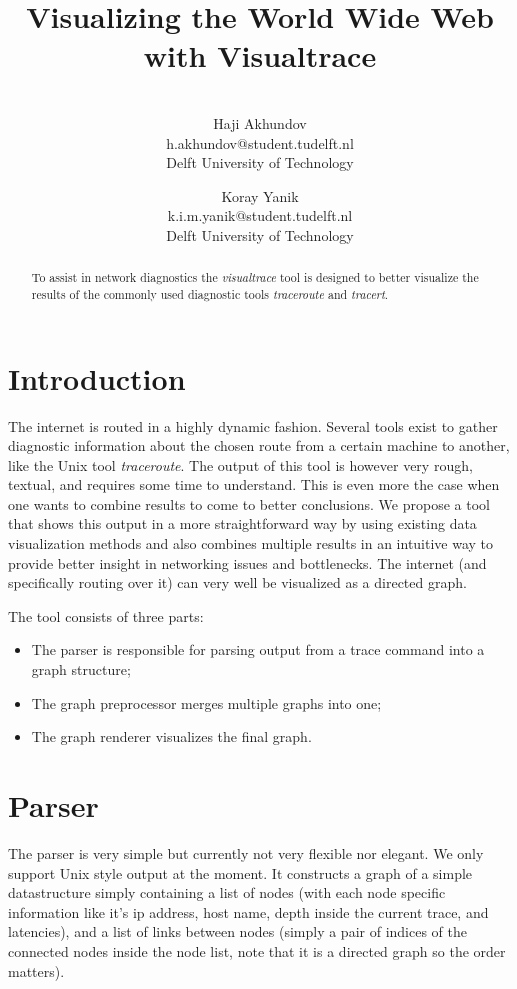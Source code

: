 \documentclass[a4paper,10pt]{article}
\title{Visualizing the World Wide Web with Visualtrace}
\author{\\Haji Akhundov\\h.akhundov@student.tudelft.nl\\ Delft University of Technology \and Koray Yanik\\k.i.m.yanik@student.tudelft.nl\\ Delft University of Technology}
\begin{document}
\maketitle

\begin{abstract}
To assist in network diagnostics the \emph{visualtrace} tool is designed to better visualize the results of the commonly used diagnostic tools \emph{traceroute} and \emph{tracert}.
\end{abstract}

\section{Introduction}
The internet is routed in a highly dynamic fashion. Several tools exist to gather diagnostic information about the chosen route from a certain machine to another, like the Unix tool \emph{traceroute}. The output of this tool is however very rough, textual, and requires some time to understand. This is even more the case when one wants to combine results to come to better conclusions. We propose a tool that shows this output in a more straightforward way by using existing data visualization methods and also combines multiple results in an intuitive way to provide better insight in networking issues and bottlenecks. The internet (and specifically routing over it) can very well be visualized as a directed graph.

The tool consists of three parts:
\begin{itemize}
\item The parser is responsible for parsing output from a trace command into a graph structure;
\item The graph preprocessor merges multiple graphs into one;
\item The graph renderer visualizes the final graph.
\end{itemize}

\section{Parser}
The parser is very simple but currently not very flexible nor elegant. We only support Unix style output at the moment. It constructs a graph of a simple datastructure simply containing a list of nodes (with each node specific information like it's ip address, host name, depth inside the current trace, and latencies), and a list of links between nodes (simply a pair of indices of the connected nodes inside the node list, note that it is a directed graph so the order matters).
\end{document}
